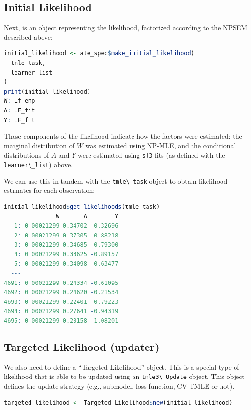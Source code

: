 \documentclass[
  12pt, krantz2,
]{book}
\newcommand{\passthrough}[1]{#1}
\theoremstyle{definition}
\theoremstyle{definition}
\theoremstyle{definition}
\newcommand{\1}{\mathbbm{1}}
\begin{document}
\hypertarget{initial-likelihood}{%
\subsection{Initial Likelihood}\label{initial-likelihood}}

Next, is an object representing the likelihood, factorized according to the
NPSEM described above:

\begin{lstlisting}[language=R]
initial_likelihood <- ate_spec$make_initial_likelihood(
  tmle_task,
  learner_list
)
print(initial_likelihood)
W: Lf_emp
A: LF_fit
Y: LF_fit
\end{lstlisting}

These components of the likelihood indicate how the factors were estimated: the
marginal distribution of \(W\) was estimated using NP-MLE, and the conditional
distributions of \(A\) and \(Y\) were estimated using \passthrough{\lstinline!sl3!} fits (as defined with
the \passthrough{\lstinline!learner\_list!}) above.

We can use this in tandem with the \passthrough{\lstinline!tmle\_task!} object to obtain likelihood
estimates for each observation:

\begin{lstlisting}[language=R]
initial_likelihood$get_likelihoods(tmle_task)
               W       A        Y
   1: 0.00021299 0.34702 -0.32696
   2: 0.00021299 0.37305 -0.88218
   3: 0.00021299 0.34685 -0.79300
   4: 0.00021299 0.33625 -0.89157
   5: 0.00021299 0.34098 -0.63477
  ---                            
4691: 0.00021299 0.24334 -0.61095
4692: 0.00021299 0.24620 -0.21534
4693: 0.00021299 0.22401 -0.79223
4694: 0.00021299 0.27641 -0.94319
4695: 0.00021299 0.20158 -1.08201
\end{lstlisting}

\hypertarget{targeted-likelihood-updater}{%
\subsection{Targeted Likelihood (updater)}\label{targeted-likelihood-updater}}

We also need to define a ``Targeted Likelihood'' object. This is a special type
of likelihood that is able to be updated using an \passthrough{\lstinline!tmle3\_Update!} object. This
object defines the update strategy (e.g., submodel, loss function, CV-TMLE or
not).

\begin{lstlisting}[language=R]
targeted_likelihood <- Targeted_Likelihood$new(initial_likelihood)
\end{lstlisting}
\end{document}
